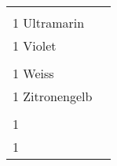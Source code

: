 \documentclass{article}\usepackage[ngerman]{babel}\usepackage{geometry}\usepackage{lmodern}
\begin{document}
\begin{table}[p]
  \begin{tabular}{ll}    \hspace{-2em}    \fbox{\begin{minipage}[t][6cm][t]{8cm}
        \fontsize{45}{54} \selectfont
        \phantom{ }\\
      \phantom{ }1 Ultramarin    \end{minipage}}
    &
\fbox{\begin{minipage}[t][6cm][t]{8cm}
        \fontsize{45}{54} \selectfont
        \phantom{ }\\
        \phantom{ } 1 Violet      \end{minipage}}\\    \hspace{-2em}    \fbox{\begin{minipage}[t][6cm][t]{8cm}
        \fontsize{45}{54} \selectfont
        \phantom{ }\\
      \phantom{ }1 Weiss    \end{minipage}}
    &
\fbox{\begin{minipage}[t][6cm][t]{8cm}
        \fontsize{45}{54} \selectfont
        \phantom{ }\\
        \phantom{ } 1 Zitronengelb      \end{minipage}}\\    \hspace{-2em}    \fbox{\begin{minipage}[t][6cm][t]{8cm}
        \fontsize{45}{54} \selectfont
        \phantom{ }\\
      \phantom{ }1      \end{minipage}}
    &
\fbox{\begin{minipage}[t][6cm][t]{8cm}
        \fontsize{45}{54} \selectfont
        \phantom{ }\\
        \phantom{ } 1        \end{minipage}}\\\end{tabular}
\end{table}
\end{document}
